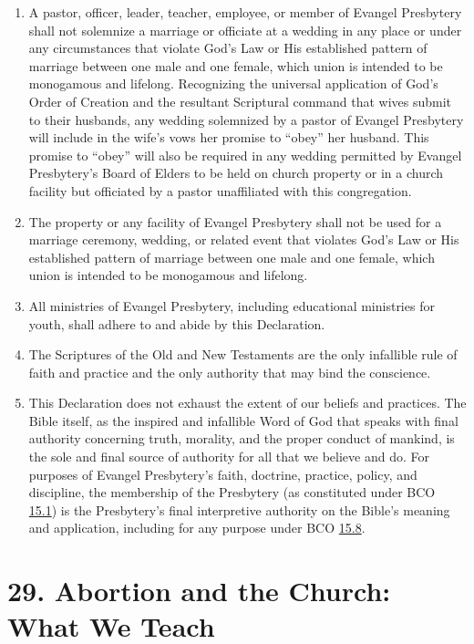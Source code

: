 \documentclass[
]{book}
\providecommand{\tightlist}{%
  \setlength{\itemsep}{0pt}\setlength{\parskip}{0pt}}
\begin{document}
\begin{enumerate}
\def\labelenumi{\arabic{enumi}.}
\setcounter{enumi}{22}
\tightlist
\item
  A pastor, officer, leader, teacher, employee, or member of Evangel Presbytery shall not solemnize a marriage or officiate at a wedding in any place or under any circumstances that violate God's Law or His established pattern of marriage between one male and one female, which union is intended to be monogamous and lifelong. Recognizing the universal application of God's Order of Creation and the resultant Scriptural command that wives submit to their husbands, any wedding solemnized by a pastor of Evangel Presbytery will include in the wife's vows her promise to ``obey'' her husband. This promise to ``obey'' will also be required in any wedding permitted by Evangel Presbytery's Board of Elders to be held on church property or in a church facility but officiated by a pastor unaffiliated with this congregation.
\item
  The property or any facility of Evangel Presbytery shall not be used for a marriage ceremony, wedding, or related event that violates God's Law or His established pattern of marriage between one male and one female, which union is intended to be monogamous and lifelong.
\item
  All ministries of Evangel Presbytery, including educational ministries for youth, shall adhere to and abide by this Declaration.
\item
  The Scriptures of the Old and New Testaments are the only infallible rule of faith and practice and the only authority that may bind the conscience.
\item
  This Declaration does not exhaust the extent of our beliefs and practices. The Bible itself, as the inspired and infallible Word of God that speaks with final authority concerning truth, morality, and the proper conduct of mankind, is the sole and final source of authority for all that we believe and do. For purposes of Evangel Presbytery's faith, doctrine, practice, policy, and discipline, the membership of the Presbytery (as constituted under BCO \protect\hyperlink{15.1}{15.1}) is the Presbytery's final interpretive authority on the Bible's meaning and application, including for any purpose under BCO \protect\hyperlink{15.8}{15.8}.
\end{enumerate}

\hypertarget{abortion-and-the-church-what-we-teach}{%
\section*{29. Abortion and the Church: What We Teach}\label{abortion-and-the-church-what-we-teach}}
\end{document}
